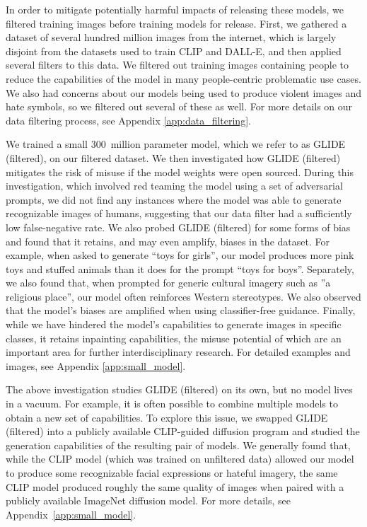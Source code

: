 In order to mitigate potentially harmful impacts of releasing these models, we filtered training images before training models for release. First, we gathered a dataset of several hundred million images from the internet, which is largely disjoint from the datasets used to train CLIP and DALL-E, and then applied several filters to this data. We filtered out training images containing people to reduce the capabilities of the model in many people-centric problematic use cases. We also had concerns about our models being used to produce violent images and hate symbols, so we filtered out several of these as well. For more details on our data filtering process, see Appendix \ref{app:data_filtering}.

We trained a small 300~million parameter model, which we refer to as GLIDE (filtered), on our filtered dataset. We then investigated how GLIDE (filtered) mitigates the risk of misuse if the model weights were open sourced. During this investigation, which involved red teaming the model using a set of adversarial prompts, we did not find any instances where the model was able to generate recognizable images of humans, suggesting that our data filter had a sufficiently low false-negative rate. We also probed GLIDE (filtered) for some forms of bias and found that it retains, and may even amplify, biases in the dataset. For example, when asked to generate ``toys for girls'', our model produces more pink toys and stuffed animals than it does for the prompt ``toys for boys''. Separately, we also found that, when prompted for generic cultural imagery such as ''a religious place'', our model often reinforces Western stereotypes. We also observed that the model's biases are amplified when using classifier-free guidance. Finally, while we have hindered the model's capabilities to generate images in specific classes, it retains inpainting capabilities,  the misuse potential of which are an important area for further interdisciplinary research. For detailed examples and images, see Appendix \ref{app:small_model}.

The above investigation studies GLIDE (filtered) on its own, but no model lives in a vacuum. For example, it is often possible to combine multiple models to obtain a new set of capabilities. To explore this issue, we swapped GLIDE (filtered) into a publicly available CLIP-guided diffusion program \citep{clipdiff} and studied the generation capabilities of the resulting pair of models. We generally found that, while the CLIP model (which was trained on unfiltered data) allowed our model to produce some recognizable facial expressions or hateful imagery, the same CLIP model produced roughly the same quality of images when paired with a publicly available ImageNet diffusion model. For more details, see Appendix~\ref{app:small_model}.

